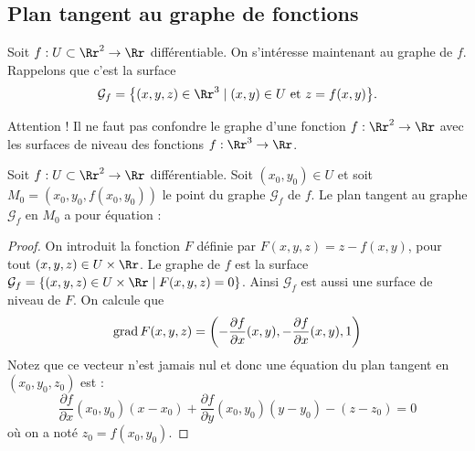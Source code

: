 \documentclass[12pt, class=report,crop=false]{standalone}
\begin{document}
\subsection{Plan tangent au graphe de fonctions}

Soit $f : U \subset \Rr^2 \to \Rr$ différentiable.
On s'intéresse maintenant au graphe de $f$. Rappelons que c'est la surface
$$\mathcal{G}_f = \big\{ (x,y,z) \in \Rr^3 \mid (x,y)\in U \text{ et } z = f(x,y) \big\}.$$

Attention ! Il ne faut pas confondre le graphe d'une fonction $f : \Rr^2 \to \Rr$
avec les surfaces de niveau des fonctions $f : \Rr^3 \to \Rr$.


\begin{proposition}
Soit $f : U \subset \Rr^2 \to \Rr$ différentiable. Soit $(x_0,y_0) \in U$ et 
soit $M_0=(x_0,y_0,f(x_0,y_0))$ le point du graphe $\mathcal{G}_f$ de $f$.
Le plan tangent au graphe $\mathcal{G}_f$ en $M_0$ a pour équation :
\end{proposition}





\begin{proof}
On introduit la fonction $F$ définie par
$F(x,y,z)=z-f(x,y)$, pour tout $(x,y,z)\in U\times \Rr$.
Le graphe de $f$ est la surface $\mathcal{G}_f=\{(x,y,z)\in U\times \Rr\mid F(x,y,z)=0\}$.
Ainsi $\mathcal{G}_f$ est aussi une surface de niveau de $F$.
On calcule que 
$$\operatorname{grad} F (x,y,z)=\left(-\frac{\partial f}{\partial x}(x,y),-\frac{\partial f}{\partial x}(x,y),1\right)$$
Notez que ce vecteur n'est jamais nul et donc une équation du plan tangent en $(x_0,y_0,z_0)$ est :
$$\frac{\partial f}{\partial x}(x_0,y_0)(x-x_0)
+\frac{\partial f}{\partial y}(x_0,y_0)(y-y_0) - (z-z_0) = 0$$
où on a noté $z_0 = f(x_0,y_0)$.
\end{proof}
\end{document}
